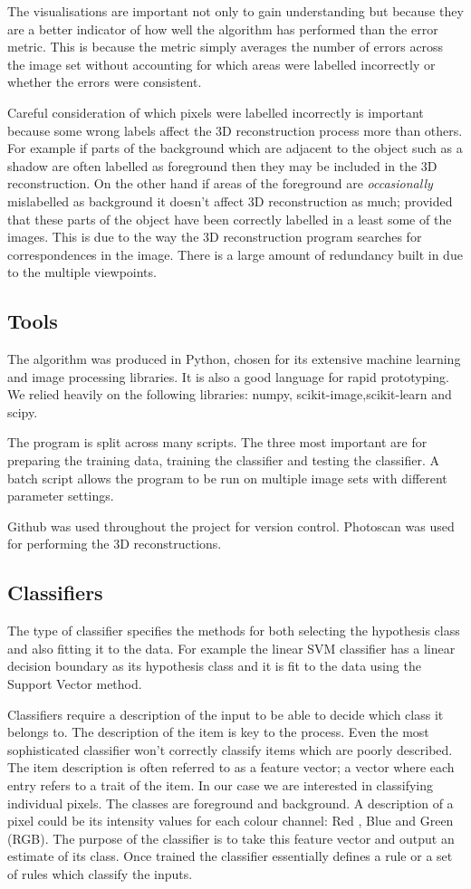 \documentclass[12pt]{IIBproject}
\begin{document}
The visualisations are important not only to gain understanding but because they are a better indicator of how well the algorithm has performed than the error metric. This is because the metric simply averages the number of errors across the image set without accounting for which areas were labelled incorrectly or whether the errors were consistent. 

Careful consideration of which pixels were labelled incorrectly is important because some wrong labels affect the 3D reconstruction process more than others. For example if parts of the background which are adjacent to the object such as a shadow are often labelled as foreground then they may be included in the 3D reconstruction. On the other hand if areas of the foreground are \emph{occasionally} mislabelled as background it doesn't affect 3D reconstruction as much; provided that these parts of the object have been correctly labelled in a least some of the images. This is due to the way the 3D reconstruction program searches for correspondences in the image. There is a large amount of redundancy built in due to the multiple viewpoints.
\subsection{Tools}
The algorithm was produced in Python, chosen for its extensive machine learning and image processing libraries. It is also a good language for rapid prototyping. We relied heavily on the following libraries: numpy, scikit-image,scikit-learn and scipy. 

The program is split across many scripts. The three most important are for preparing the training data, training the classifier and testing the classifier. A batch script allows the program to be run on multiple image sets with different parameter settings.

Github was used throughout the project for version control. Photoscan \cite{photoscan} was used for performing the 3D reconstructions.
\subsection{Classifiers}
The type of classifier specifies the methods for both selecting the hypothesis class and also fitting it to the data. For example the linear SVM classifier has a linear decision boundary as its hypothesis class and it is fit to the data using the Support Vector method.

Classifiers require a description of the input to be able to decide which class it belongs to. The description of the item is key to the process. Even the most sophisticated classifier won't correctly classify items which are poorly described. The item description is often referred to as a feature vector; a vector where each entry refers to a trait of the item. In our case we are interested in classifying individual pixels. The classes are foreground and background. A description of a pixel could be its intensity values for each colour channel: Red , Blue and Green (RGB). The purpose of the classifier is to take this feature vector and output an estimate of its class. Once trained the classifier essentially defines a rule or a set of rules which classify the inputs.
\end{document}
